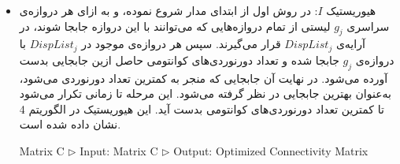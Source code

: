 \begin{itemize}
\item
هیوریستیک $I$:
در روش اول از ابتدای مدار شروع نموده، و به ازای هر دروازه‌ی سراسری $g_j$ لیستی از تمام دروازه‌هایی که می‌توانند با این دروازه جابجا شوند، در آرایه‌ی $DispList_j$ قرار می‌گیرند. سپس هر دروازه‌ی موجود در $DispList_j$ با دروازه‌ی $g_j$ جابجا شده و تعداد دورنوردی‌های کوانتومی حاصل ازین جابجایی بدست آورده می‌شود. در نهایت آن جابجایی که منجر به کمترین تعداد دورنوردی می‌شود، به‌عنوان بهترین جابجایی در نظر گرفته می‌شود. این مرحله تا زمانی تکرار می‌شود تا کمترین تعداد دورنوردی‌های کوانتومی بدست آید. این هیوریستیک در الگوریتم 4 نشان داده شده است.



\begin{latin}
\begin{algorithm}[h]
{
\fontsize{9}{1}
\caption{Heuristic I}
\begin{algorithmic}[1]
 {Matrix C}
\State\textcolor[rgb]{0.00,0.50,1.00}{ $\triangleright$ Input: Matrix C}
\State\textcolor[rgb]{0.00,0.50,1.00}{ $\triangleright$ Output: Optimized Connectivity Matrix}

       \EndIf
 \EndFor
\EndFor
{}
             \EndIf
 \EndFor
 \EndFor
\EndFunction

\end{algorithmic}
}
\end{algorithm}
\end{latin}


\end{itemize}
